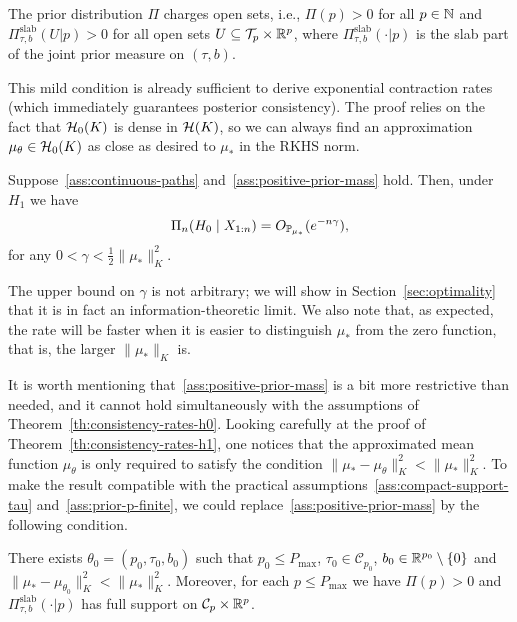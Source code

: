 \begin{assumption}\label{ass:positive-prior-mass}
  The prior distribution \(\Pi\) charges open sets, i.e., \(\Pi(p)>0\) for all \(p\in\mathbb{N}\) and \(\Pi_{\tau,b}^{\text{slab}}(U|p)>0\) for all open sets \(U \subseteq \mathcal T_p\times \mathbb{R}^p\), where \(\Pi_{\tau,b}^{\text{slab}}(\cdot|p)\) is the slab part of the joint prior measure on \((\tau, b)\).
  
\end{assumption}

This mild condition is already sufficient to derive exponential contraction rates (which immediately guarantees posterior consistency). The proof relies on the fact that \(\mathcal{H}_0(K)\) is dense in \(\mathcal{H}(K)\), so we can always find an approximation \(\mu_{\theta}\in\mathcal{H}_0(K)\) as close as desired to \(\mu_*\) in the \acs{RKHS} norm.

\begin{theorem}\label{th:consistency-rates-h1}
  Suppose~\ref{ass:continuous-paths} and~\ref{ass:positive-prior-mass} hold. Then, under \(H_1\) we have
  \[
    \Pi_n(H_0\mid X_{1:n}) = O_{\mathbb{P}_{\mu_*}}(e^{-n\gamma}),
  \]
  for any \(0 < \gamma < \frac{1}{2}\|\mu_*\|^2_K\).
\end{theorem}

\begin{remark}
  The upper bound on \(\gamma\) is not arbitrary; we will show in Section~\ref{sec:optimality} that it is in fact an information-theoretic limit. We also note that, as expected, the rate will be faster when it is easier to distinguish \(\mu_*\) from the zero function, that is, the larger \(\|\mu_*\|_K\) is.
\end{remark}

It is worth mentioning that~\ref{ass:positive-prior-mass} is a bit more restrictive than needed, and it cannot hold simultaneously with the assumptions of Theorem~\ref{th:consistency-rates-h0}. Looking carefully at the proof of Theorem~\ref{th:consistency-rates-h1}, one notices that the approximated mean function \(\mu_\theta\) is only required to satisfy the condition \(\|\mu_* - \mu_{\theta}\|^2_K < \|\mu_*\|^2_K\). To make the result compatible with the practical assumptions~\ref{ass:compact-support-tau} and~\ref{ass:prior-p-finite}, we could replace~\ref{ass:positive-prior-mass} by the following condition.

\begin{assumptionalt}\label{ass:positive-prior-mass-alt}
  There exists \(\theta_0=(p_0,\tau_0,b_0)\) such that \(p_0\leq P_{\max}\), \(\tau_0\in \mathcal C_{p_0}\), \(b_0\in\mathbb{R}^{p_0} \setminus \{0\}\) and \(\|\mu_* - \mu_{\theta_0}\|^2_K < \|\mu_*\|^2_K\). Moreover, for each \(p\leq P_{\max}\) we have \(\Pi(p)>0\) and \(\Pi_{\tau,b}^{\text{slab}}(\cdot|p)\) has full support on \(\mathcal C_p \times \mathbb{R}^p\).
\end{assumptionalt}


